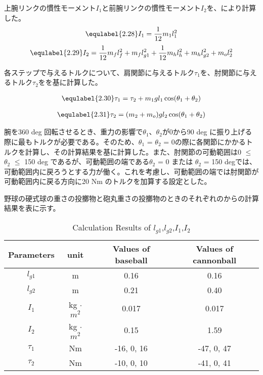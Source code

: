 上腕リンクの慣性モーメント$I_{1}$と前腕リンクの慣性モーメント$I_{2}$を、により計算した。
\begin{eqnarray}
  \equlabel{2.28}
  I_{1}=\frac{1}{12}m_{1}l_{1}^{2}
\end{eqnarray}
\begin{eqnarray}
  \equlabel{2.29}
  I_{2}=\frac{1}{12}m_{f}l_{f}^{2}+m_{f}l_{g1}^{2}+\frac{1}{12}m_{h}l_{h}^{2}+m_{h}l_{g2}^{2}+m_{o}l_{2}^{2}
\end{eqnarray}

各ステップで与えるトルクについて、肩関節に与えるトルク$\tau_{1}$を、肘関節に与えるトルク$\tau_{2}$をを基に計算した。

\begin{eqnarray}
  \equlabel{2.30}
  \tau_{1} = \tau_{2} + m_{1}gl_{1}\cos(\theta_{1} + \theta_{2})
\end{eqnarray}

\begin{eqnarray}
  \equlabel{2.31}
  \tau_{2} = (m_{2} + m_{o})gl_{2}\cos(\theta_{1} + \theta_{2})
\end{eqnarray}

腕を360 deg 回転させるとき、重力の影響で$\theta_{1}$、$\theta_{2}$が0から90 deg に振り上げる際に最もトルクが必要である。そのため、$\theta_{1}$ = $\theta_{2}$ = 0の際に各関節にかかるトルクを計算し、その計算結果を基に計算した。また、肘関節の可動範囲は0 $\le$ $\theta_{2}$ $\le$ 150 deg であるが、可動範囲の端である$\theta_{2}$ = 0 または $\theta_{2}$ = 150 degでは、可動範囲内に戻ろうとする力が働く。これを考慮し、可動範囲の端では肘関節が可動範囲内に戻る方向に20 Nm のトルクを加算する設定とした。

野球の硬式球の重さの投擲物と砲丸重さの投擲物のときのそれぞれのからの計算結果を表に示す。
\begin{table}[tb]
  \begin{center}
    \caption{Calculation Results of $l_{g1}$,$l_{g2}$,$I_{1}$,$I_{2}$}
    \begin{tabular}{c|c|c|c}
      \hline
      Parameters & unit & Values of baseball & Values of cannonball \\
      \hline
      $l_{g1}$ & m & 0.16 & 0.16 \\
      $l_{g2}$ & m & 0.21 & 0.40 \\
      $I_{1}$ & kg $\cdot$ ${m}^2$ & 0.017 & 0.017 \\
      $I_{2}$ & kg $\cdot$ ${m}^2$ & 0.15 & 1.59 \\
      $\tau_{1}$ & Nm & -16, 0, 16 & -47, 0, 47 \\
      $\tau_{2}$ & Nm & -10, 0, 10 & -41, 0, 41 \\
      \hline
    \end{tabular}
  \end{center}
\end{table}

